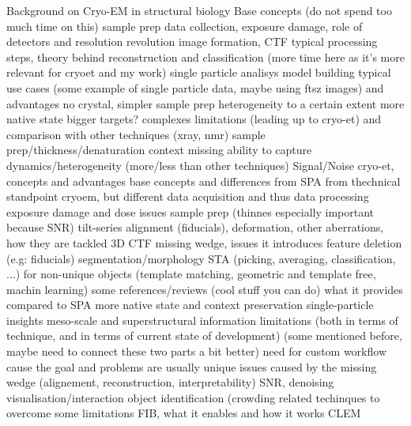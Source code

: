 \begin{outline}
\1 Background on Cryo-EM in structural biology
    \2 Base concepts (do not spend too much time on this)
        \3 sample prep
        \3 data collection, exposure damage, role of detectors and resolution revolution \cite{faruqiCCDDetectorsHighresolution2000}
        \3 image formation, CTF
        \3 typical processing steps, theory behind reconstruction and classification (more time here as it's more relevant for cryoet and my work)
        \3 single particle analisys
        \3 model building
    \2 typical use cases (some example of single particle data, maybe using ftsz images) and advantages
        \3 no crystal, simpler sample prep
        \3 heterogeneity to a certain extent
        \3 more native state
        \3 bigger targets? complexes
    \2 limitations (leading up to cryo-et) and comparison with other techniques (xray, nmr)
        \3 sample prep/thickness/denaturation
        \3 context missing
        \3 ability to capture dynamics/heterogeneity (more/less than other techniques)
        \3 Signal/Noise
\1 cryo-et, concepts and advantages
    \2 base concepts and differences from SPA from thechnical standpoint
        \2 cryoem, but different data acquisition and thus data processing
        \3 exposure damage and dose issues
        \3 sample prep (thinnes especially important because SNR)
        \3 tilt-series alignment (fiducials), deformation, other aberrations, how they are tackled
        \3 3D CTF
        \3 missing wedge, issues it introduces
        \3 feature deletion (e.g: fiducials)
        \3 segmentation/morphology
        \3 STA (picking, averaging, classification, ...) for non-unique objects (template matching, geometric and template free, machin learning)
    \2 some references/reviews (cool stuff you can do)
        \3 \cite{turkPromiseChallengesCryoelectron2020,lucicCryoelectronTomographyChallenge2013}
    \2 what it provides compared to SPA
        \3 more native state and context preservation
        \3 single-particle insights
        \3 meso-scale and superstructural information
    \2 limitations (both in terms of technique, and in terms of current state of development)
        \3 (some mentioned before, maybe need to connect these two parts a bit better)
        \3 need for custom workflow cause the goal and problems are usually unique
        \3 issues caused by the missing wedge (alignement, reconstruction, interpretability)
        \3 SNR, denoising
        \3 visualisation/interaction
        \3 object identification (crowding
    \2 related techinques to overcome some limitations
        \3 FIB, what it enables and how it works
        \2 CLEM
\end{outline}


